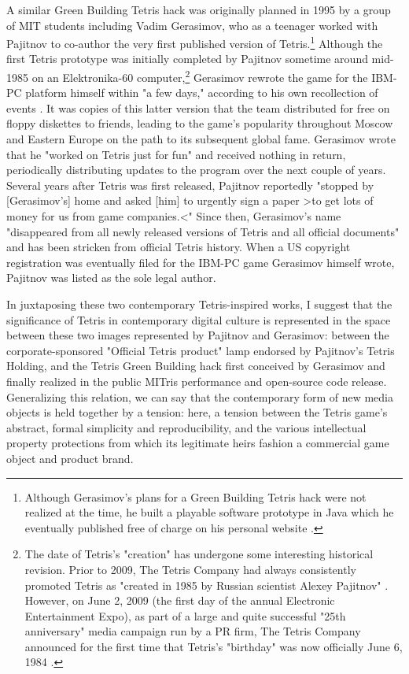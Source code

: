 A similar Green Building Tetris hack was originally planned in 1995 by a group of MIT students including Vadim Gerasimov, who as a teenager worked with Pajitnov to co-author the very first published version of Tetris.\footnote{
  Although Gerasimov's plans for a Green Building Tetris hack were not realized at the time, he built a playable software prototype in Java which he eventually published free of charge on his personal website \autocite*{Gerasimov-green}.
}
Although the first Tetris prototype was initially completed by Pajitnov sometime around mid-1985 on an Elektronika-60 computer,\footnote{ The date of Tetris's "creation" has undergone some interesting historical revision. Prior to 2009, The Tetris Company had always consistently promoted Tetris as "created in 1985 by Russian scientist Alexey Pajitnov" \autocite{Tetris-dot-com}. However, on June 2, 2009 (the first day of the annual Electronic Entertainment Expo), as part of a large and quite successful "25th anniversary" media campaign run by a PR firm, The Tetris Company announced for the first time that Tetris's "birthday" was now officially June 6, 1984 \autocite{TetrisPR}.} Gerasimov rewrote the game for the IBM-PC platform himself within "a few days," according to his own recollection of events \autocite*{Gerasimov-tetris}. It was copies of this latter version that the team distributed for free on floppy diskettes to friends, leading to the game's popularity throughout Moscow and Eastern Europe on the path to its subsequent global fame. Gerasimov wrote that he "worked on Tetris just for fun" and received nothing in return, periodically distributing updates to the program over the next couple of years. Several years after Tetris was first released, Pajitnov reportedly "stopped by [Gerasimov's] home and asked [him] to urgently sign a paper >to get lots of money for us from game companies.<" Since then, Gerasimov's name "disappeared from all newly released versions of Tetris and all official documents" and has been stricken from official Tetris history. When a US copyright registration was eventually filed for the IBM-PC game Gerasimov himself wrote, Pajitnov was listed as the sole legal author.

In juxtaposing these two contemporary Tetris-inspired works, I suggest that the significance of Tetris in contemporary digital culture is represented in the space between these two images represented by Pajitnov and Gerasimov: between the corporate-sponsored "Official Tetris\texttrademark{} product" lamp endorsed by Pajitnov's Tetris Holding, and the Tetris Green Building hack first conceived by Gerasimov and finally realized in the public MITris performance and open-source code release. Generalizing this relation, we can say that the contemporary form of new media objects is held together by a tension: here, a tension between the Tetris game's abstract, formal simplicity and reproducibility, and the various intellectual property protections from which its legitimate heirs fashion a commercial game object and product brand.

